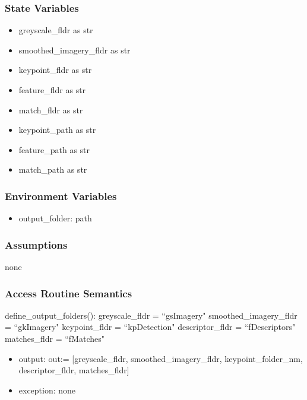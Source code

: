 \documentclass[12pt, titlepage]{article}
\begin{document}
  \subsubsection{State Variables}
  \begin{itemize}
    \item greyscale\_fldr as str
    \item smoothed\_imagery\_fldr as str
    \item keypoint\_fldr as str
    \item feature\_fldr as str
    \item match\_fldr as str
    \item keypoint\_path as str
    \item feature\_path as str
    \item match\_path as str
  \end{itemize}
  
  \subsubsection{Environment Variables}
  \begin{itemize}
    \item output\_folder: path
  \end{itemize}
  
  
  \subsubsection{Assumptions}
  none 
  \subsubsection{Access Routine Semantics}
  
  \noindent define\_output\_folders(): \newline \newline 
  greyscale\_fldr = ``gsImagery" \newline
  smoothed\_imagery\_fldr = ``gkImagery" \newline
  keypoint\_fldr = ``kpDetection" \newline
  descriptor\_fldr = ``fDescriptors" \newline
  matches\_fldr = ``fMatches" 
  \begin{itemize}
    \item output: out:= [greyscale\_fldr, smoothed\_imagery\_fldr, keypoint\_folder\_nm, descriptor\_fldr, matches\_fldr]
    \item exception: none 
  \end{itemize}
\end{document}
